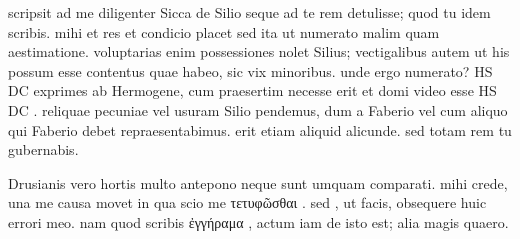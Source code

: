 


 scripsit ad me diligenter Sicca de Silio seque ad te rem detulisse; quod tu idem scribis. mihi et res et condicio placet sed ita ut numerato malim quam aestimatione. voluptarias enim possessiones nolet Silius; vectigalibus autem ut his possum esse contentus quae habeo, sic vix minoribus. unde ergo numerato? HS DC exprimes ab Hermogene, cum praesertim necesse erit et domi video esse HS DC . reliquae pecuniae vel usuram Silio pendemus, dum a Faberio vel cum aliquo qui Faberio debet repraesentabimus. erit etiam aliquid alicunde. sed totam rem tu gubernabis.

 Drusianis vero hortis multo antepono neque sunt umquam comparati. mihi crede, una me causa movet in qua scio me τετυφῶσθαι . sed , ut facis, obsequere huic errori meo. nam quod scribis ἐγγήραμα , actum iam de isto est; alia magis quaero.
